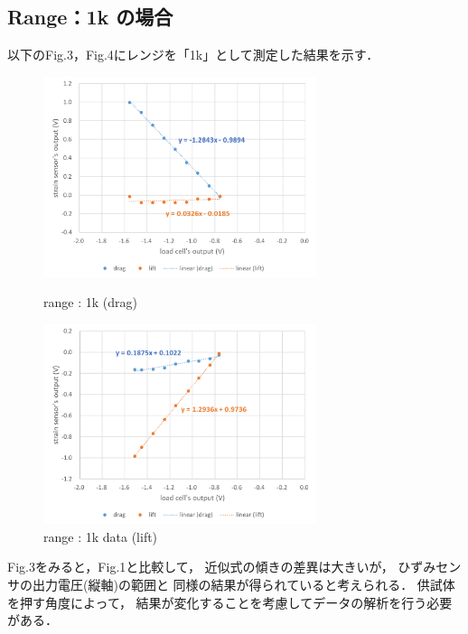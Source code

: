 \documentclass[twocolumn,a4j]{jsarticle}
\begin{document}
\subsection{Range：1k の場合}
以下のFig.3，Fig.4にレンジを「1k」として測定した結果を示す．
\begin{figure}[htbp]
    \footnotesize
    \begin{center}
        \includegraphics[width=80mm]{../images/1k_drag.png}
        \caption{range : 1k (drag)}
        \includegraphics[width=80mm]{../images/1k_lift.png}
        \caption{range : 1k data (lift)}
    \end{center}
\end{figure}\par
Fig.3をみると，Fig.1と比較して，
近似式の傾きの差異は大きいが，
ひずみセンサの出力電圧(縦軸)の範囲と
同様の結果が得られていると考えられる．
供試体を押す角度によって，
結果が変化することを考慮してデータの解析を行う必要がある．
\newpage
\end{document}
